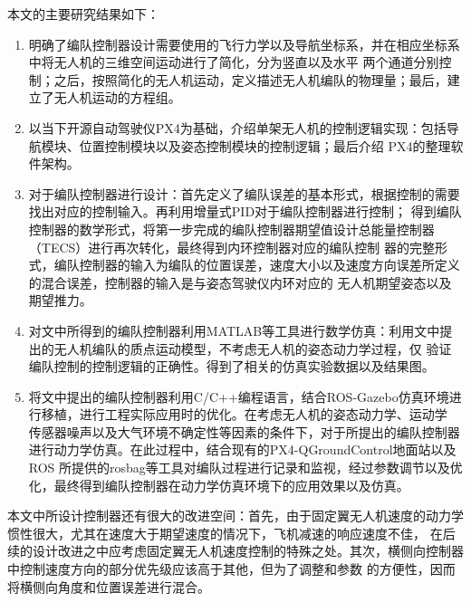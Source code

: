 本文的主要研究结果如下：
\begin{enumerate}
    \item 明确了编队控制器设计需要使用的飞行力学以及导航坐标系，并在相应坐标系中将无人机的三维空间运动进行了简化，分为竖直以及水平
        两个通道分别控制；之后，按照简化的无人机运动，定义描述无人机编队的物理量；最后，建立了无人机运动的方程组。
    \item 以当下开源自动驾驶仪PX4为基础，介绍单架无人机的控制逻辑实现：包括导航模块、位置控制模块以及姿态控制模块的控制逻辑；最后介绍
        PX4的整理软件架构。
    \item 对于编队控制器进行设计：首先定义了编队误差的基本形式，根据控制的需要找出对应的控制输入。再利用增量式PID对于编队控制器进行控制；
        得到编队控制器的数学形式，将第一步完成的编队控制器期望值设计总能量控制器（TECS）进行再次转化，最终得到内环控制器对应的编队控制
        器的完整形式，编队控制器的输入为编队的位置误差，速度大小以及速度方向误差所定义的混合误差，控制器的输入是与姿态驾驶仪内环对应的
        无人机期望姿态以及期望推力。
    \item 对文中所得到的编队控制器利用MATLAB等工具进行数学仿真：利用文中提出的无人机编队的质点运动模型，不考虑无人机的姿态动力学过程，仅
        验证编队控制的控制逻辑的正确性。得到了相关的仿真实验数据以及结果图。
    \item 将文中提出的编队控制器利用C/C++编程语言，结合ROS-Gazebo仿真环境进行移植，进行工程实际应用时的优化。在考虑无人机的姿态动力学、运动学
        传感器噪声以及大气环境不确定性等因素的条件下，对于所提出的编队控制器进行动力学仿真。在此过程中，结合现有的PX4-QGroundControl地面站以及ROS
        所提供的rosbag等工具对编队过程进行记录和监视，经过参数调节以及优化，最终得到编队控制器在动力学仿真环境下的应用效果以及仿真。
\end{enumerate}
本文中所设计控制器还有很大的改进空间：首先，由于固定翼无人机速度的动力学惯性很大，尤其在速度大于期望速度的情况下，飞机减速的响应速度不佳，
在后续的设计改进之中应考虑固定翼无人机速度控制的特殊之处。其次，横侧向控制器中控制速度方向的部分优先级应该高于其他，但为了调整和参数
的方便性，因而将横侧向角度和位置误差进行混合。
